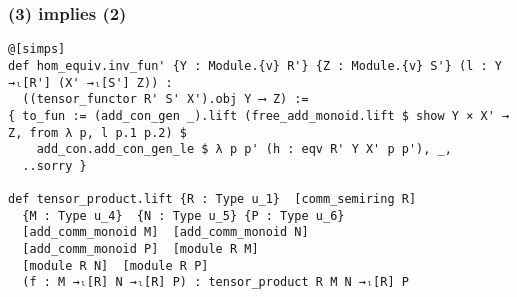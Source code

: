\documentclass[aspectratio=169]{beamer}
\begin{document}
\begin{frame}[fragile]
\frametitle{(3) implies (2)}
\begin{minipage}{0.1\textwidth}
\end{minipage}%
\begin{minipage}{0.9\textwidth}
\begin{lstlisting}
@[simps]
def hom_equiv.inv_fun' {Y : Module.{v} R'} {Z : Module.{v} S'} (l : Y →ₗ[R'] (X' →ₗ[S'] Z)) :
  ((tensor_functor R' S' X').obj Y ⟶ Z) :=
{ to_fun := (add_con_gen _).lift (free_add_monoid.lift $ show Y × X' → Z, from λ p, l p.1 p.2) $ 
    add_con.add_con_gen_le $ λ p p' (h : eqv R' Y X' p p'), _,
  ..sorry }

def tensor_product.lift {R : Type u_1}  [comm_semiring R]  
  {M : Type u_4}  {N : Type u_5} {P : Type u_6}  
  [add_comm_monoid M]  [add_comm_monoid N]  
  [add_comm_monoid P]  [module R M] 
  [module R N]  [module R P]  
  (f : M →ₗ[R] N →ₗ[R] P) : tensor_product R M N →ₗ[R] P
\end{lstlisting}

\end{minipage}%

\end{frame}
\end{document}
